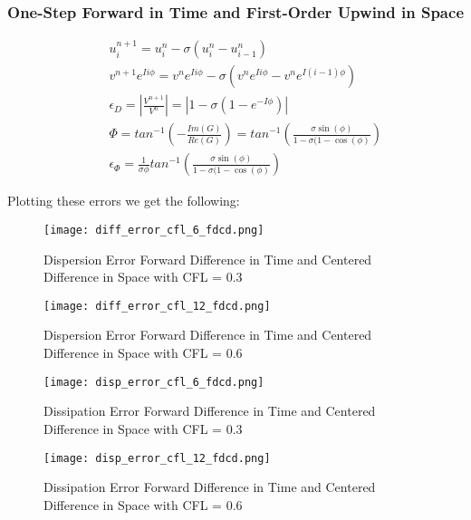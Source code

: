 \documentclass[a4paper,12pt,titlepage]{article}
\newcommand{\scale}{0.5}
\begin{document}
\subsubsection{One-Step Forward in Time and First-Order Upwind in Space}
\begin{eqnarray}
&&u_{i}^{n+1} = u_{i}^n - \sigma (u_i^n-u_{i-1}^n)\nonumber \\
&&v^{n+1}e^{Ii\phi} = v^{n}e^{Ii\phi} - \sigma(v^{n}e^{Ii\phi}-v^{n}e^{I(i-1)\phi})\nonumber \\
&&\boxed{\epsilon_D = \left|\frac{V^{n+1}}{V^n}\right| = \left|1-\sigma(1-e^{-I\phi})\right|}\nonumber \\
&&\Phi = tan^{-1}\left(-\frac{Im(G)}{Re(G)} \right) = tan^{-1}\left(\frac{\sigma \sin(\phi)}{1-\sigma(1-\cos(\phi)} \right)\nonumber \\
&&\boxed{\epsilon_\Phi = \frac{1}{\sigma \phi} tan^{-1}\left(\frac{\sigma \sin(\phi)}{1-\sigma(1-\cos(\phi)} \right)}
\end{eqnarray}

Plotting these errors we get the following:

\begin{figure}[H]
  \begin{center}
    \texttt{[image: diff\_error\_cfl\_6\_fdcd.png]}
    \caption{Dispersion Error Forward Difference in Time and Centered Difference in Space with CFL = 0.3}
  \end{center}
\end{figure}

\begin{figure}[H]
  \begin{center}
    \texttt{[image: diff\_error\_cfl\_12\_fdcd.png]}
    \caption{Dispersion Error Forward Difference in Time and Centered Difference in Space with CFL = 0.6}
  \end{center}
\end{figure}

\begin{figure}[H]
  \begin{center}
    \texttt{[image: disp\_error\_cfl\_6\_fdcd.png]}
    \caption{Dissipation Error Forward Difference in Time and Centered Difference in Space with CFL = 0.3}
  \end{center}
\end{figure}

\begin{figure}[H]
  \begin{center}
    \texttt{[image: disp\_error\_cfl\_12\_fdcd.png]}
    \caption{Dissipation Error Forward Difference in Time and Centered Difference in Space with CFL = 0.6}
  \end{center}
\end{figure}
\end{document}
